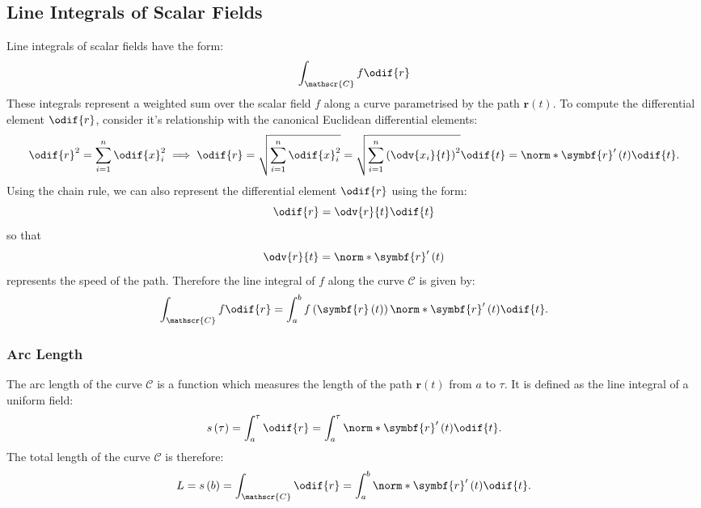 \documentclass{article}
\begin{document}
\subsection{Line Integrals of Scalar Fields}
Line integrals of scalar fields have the form:
\begin{equation*}
    \int_{\mathscr{C}} f \odif{r}
\end{equation*}
These integrals represent a weighted sum over the scalar field \(f\)
along a curve parametrised by the path \(\symbf{r}\left( t \right)\).
To compute the differential element \(\odif{r}\), consider it's
relationship with the canonical Euclidean differential elements:
\begin{equation*}
    \odif{r}^2 = \sum_{i = 1}^n \odif{x}_i^2 \implies \odif{r} = \sqrt{\sum_{i = 1}^n \odif{x}_i^2} = \sqrt{\sum_{i = 1}^n \left( \odv{x_i}{t} \right)^2} \odif{t} = \norm*{\symbf{r}'\left( t \right)} \odif{t}.
\end{equation*}
Using the chain rule, we can also represent the differential element
\(\odif{r}\) using the form:
\begin{equation*}
    \odif{r} = \odv{r}{t} \odif{t}
\end{equation*}
so that
\begin{equation*}
    \odv{r}{t} = \norm*{\symbf{r}'\left( t \right)}
\end{equation*}
represents the speed of the path. Therefore the line integral of \(f\)
along the curve \(\mathscr{C}\) is given by:
\begin{equation*}
    \int_{\mathscr{C}} f \odif{r} = \int_a^b f\left( \symbf{r}\left( t \right) \right) \norm*{\symbf{r}'\left( t \right)} \odif{t}.
\end{equation*}
\subsubsection{Arc Length}
The arc length of the curve \(\mathscr{C}\) is a function which
measures the length of the path \(\symbf{r}\left( t \right)\) from
\(a\) to \(\tau\). It is defined as the line integral of a uniform field:
\begin{equation*}
    s\left( \tau \right) = \int_a^\tau \odif{r} = \int_a^\tau \norm*{\symbf{r}'\left( t \right)} \odif{t}.
\end{equation*}
The total length of the curve \(\mathscr{C}\) is therefore:
\begin{equation*}
    L = s\left( b \right) = \int_{\mathscr{C}} \odif{r} = \int_a^b \norm*{\symbf{r}'\left( t \right)} \odif{t}.
\end{equation*}
\end{document}
